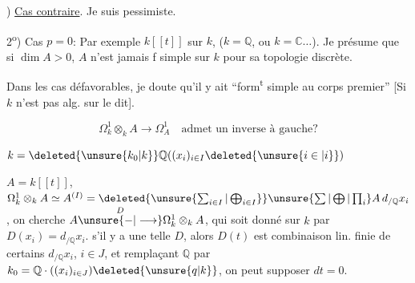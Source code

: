
) \uline{Cas contraire}. Je suis pessimiste.

2\textsuperscript{o}) Cas $p=0$: Par exemple $k[[t]]$ sur $k$, ($k=\mathbb{Q}$, ou $k=\mathbb{C}\ldots$). Je présume que si $\dim A>0$, $A$ n'est jamais f simple sur $k$ pour sa topologie discrète.

Dans les cas défavorables, je doute qu'il y ait  ``form\textsuperscript{t} simple  au corps premier'' [Si $k$ n'est pas alg. sur le dit].

\[ \Omega^1_k\otimes_k A\longrightarrow\Omega^1_A\quad \text{admet un inverse à gauche?} \]

 $k=\deleted{\unsure{k_0|k}}\mathbb{Q}((x_i)_{i\in I}\deleted{\unsure{i\in|i}})$ 

$A=k[[t]]$, $\Omega^1_k\otimes_k A\simeq A^{(I)}=\deleted{\unsure{\sum_{i\in I}|\bigoplus_{i\in I}}}\unsure{\sum|\bigoplus|\prod_i} A\, d_{/\mathbb{Q}}x_i$, on cherche $A\overset{D}{\unsure{-|\longrightarrow}}\Omega^1_k\otimes_k A$, qui soit donné sur $k$ par $D(x_i)=d_{/\mathbb{Q}}x_i$.  s'il y a une telle $D$, alors $D(t)$ est combinaison lin. finie de certains $d_{/\mathbb{Q}}x_i$, $i\in J$, et remplaçant $\mathbb{Q}$ par $k_0=\mathbb{Q}\cdot((x_i)_{i\in J})\deleted{\unsure{q|k}}$, on peut supposer  $dt=0$. 
